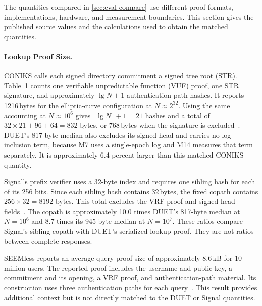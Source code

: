 The quantities compared in \cref{sec:eval-compare} use different proof formats, implementations,
hardware, and measurement boundaries. This section gives the published source values and the
calculations used to obtain the matched quantities.

\paragraph{Lookup Proof Size.}
CONIKS calls each signed directory commitment a signed tree root (STR). Table~1 counts one
verifiable unpredictable function (VUF) proof, one STR signature, and approximately $\lg N+1$
authentication-path hashes. It reports \num{1216}\,bytes for the elliptic-curve configuration at
$N\approx2^{32}$. Using the same accounting at $N\approx10^6$ gives
$\lceil\lg N\rceil+1=21$ hashes and a total of
$32\times21+96+64=832$ bytes, or \num{768}\,bytes when the signature is
excluded~\cite[Section~5.3 and Table~1]{melara2015coniks}. DUET's \num{817}-byte median also
excludes its signed head and carries no log-inclusion term, because M7 uses a single-epoch log and
M14 measures that term separately. It is approximately 6.4 percent larger than this matched CONIKS
quantity.

Signal's prefix verifier uses a \num{32}-byte index and requires one sibling hash for each of its
\num{256} bits. Since each sibling hash contains \num{32}\,bytes, the fixed copath contains
$256\times32=\num{8192}$ bytes. This total excludes the VRF proof and signed-head
fields~\cite{signal-kt-server}. The copath is approximately 10.0 times DUET's \num{817}-byte median at
$N=10^6$ and 8.7 times its \num{945}-byte median at $N=10^7$. These ratios compare Signal's
sibling copath with DUET's serialized lookup proof. They are not ratios between complete responses.

SEEMless reports an average query-proof size of approximately 8.6\,kB for 10 million users. The
reported proof includes the username and public key, a commitment and its opening, a VRF proof, and
authentication-path material. Its construction uses three authentication paths for each
query~\cite{chase2019seemless}. This result provides additional context but is not directly
matched to the DUET or Signal quantities.

